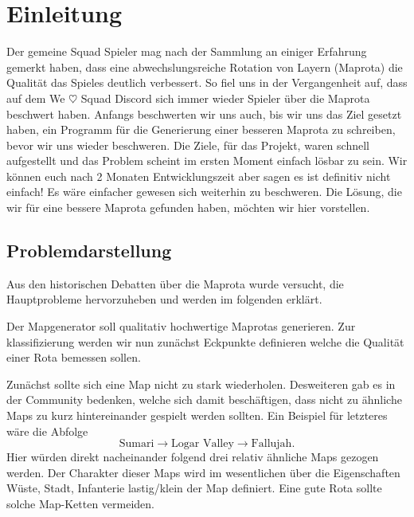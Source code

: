 \section{Einleitung}
        
        Der gemeine Squad Spieler mag nach der Sammlung an einiger Erfahrung gemerkt haben, dass eine abwechslungsreiche Rotation von Layern (Maprota)
        die Qualität das Spieles deutlich verbessert. So fiel uns in der Vergangenheit auf, dass auf dem We $\heartsuit$ Squad Discord sich immer wieder 
        Spieler über die Maprota beschwert haben. Anfangs beschwerten wir uns auch, bis wir uns das Ziel gesetzt haben, ein Programm 
        für die Generierung einer besseren Maprota zu schreiben, bevor wir uns wieder beschweren. 
        Die Ziele, für das Projekt, waren schnell aufgestellt und das Problem scheint im ersten Moment einfach lösbar zu sein.
        Wir können euch nach 2 Monaten Entwicklungszeit aber sagen es ist definitiv nicht einfach! Es wäre einfacher gewesen sich weiterhin zu beschweren.
        Die Lösung, die wir für eine bessere Maprota gefunden haben, möchten wir hier vorstellen.  

        \subsection{Problemdarstellung}
            Aus den historischen Debatten über die Maprota wurde versucht, die Hauptprobleme hervorzuheben und werden im folgenden erklärt.

            Der Mapgenerator soll qualitativ hochwertige Maprotas generieren.
            Zur klassifizierung werden wir nun zunächst Eckpunkte definieren welche die Qualität einer Rota bemessen sollen.

            Zunächst sollte sich eine Map nicht zu stark wiederholen.
            Desweiteren gab es in der Community bedenken, welche sich damit beschäftigen, dass nicht zu ähnliche Maps zu kurz hintereinander gespielt werden sollten. 
            Ein Beispiel für letzteres wäre die Abfolge 
            \begin{equation*}
                \text{Sumari} \rightarrow \text{Logar Valley} \rightarrow \text{Fallujah}.
            \end{equation*}
            Hier würden direkt nacheinander folgend drei relativ ähnliche Maps gezogen werden. 
            Der Charakter dieser Maps wird im wesentlichen über die Eigenschaften \glqq{}Wüste\grqq{}, \glqq{}Stadt\grqq{}, \glqq{}Infanterie lastig/klein\grqq{} der Map definiert.
            Eine gute Rota sollte solche Map-Ketten vermeiden.

